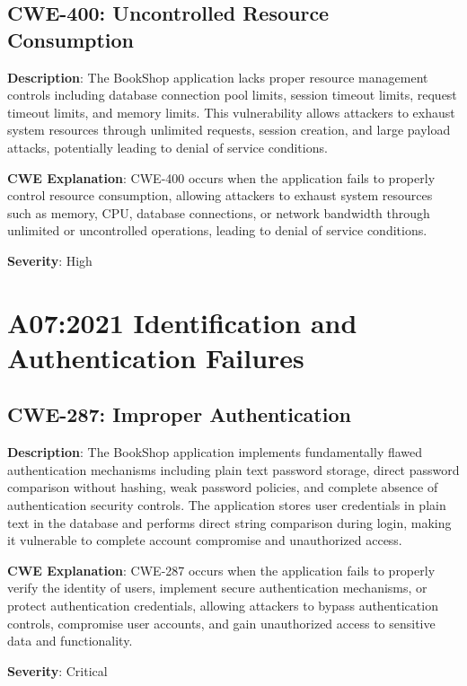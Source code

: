 \documentclass[]{UCD_CS_FYP_Report}
\begin{document}
\section{CWE-400: Uncontrolled Resource Consumption}

\textbf{Description}: The BookShop application lacks proper resource management controls including database connection pool limits, session timeout limits, request timeout limits, and memory limits. This vulnerability allows attackers to exhaust system resources through unlimited requests, session creation, and large payload attacks, potentially leading to denial of service conditions.

\textbf{CWE Explanation}: CWE-400 occurs when the application fails to properly control resource consumption, allowing attackers to exhaust system resources such as memory, CPU, database connections, or network bandwidth through unlimited or uncontrolled operations, leading to denial of service conditions.

\textbf{Severity}: High



\chapter{A07:2021 Identification and Authentication Failures}

\section{CWE-287: Improper Authentication}

\textbf{Description}: The BookShop application implements fundamentally flawed authentication mechanisms including plain text password storage, direct password comparison without hashing, weak password policies, and complete absence of authentication security controls. The application stores user credentials in plain text in the database and performs direct string comparison during login, making it vulnerable to complete account compromise and unauthorized access.

\textbf{CWE Explanation}: CWE-287 occurs when the application fails to properly verify the identity of users, implement secure authentication mechanisms, or protect authentication credentials, allowing attackers to bypass authentication controls, compromise user accounts, and gain unauthorized access to sensitive data and functionality.

\textbf{Severity}: Critical
\end{document}

